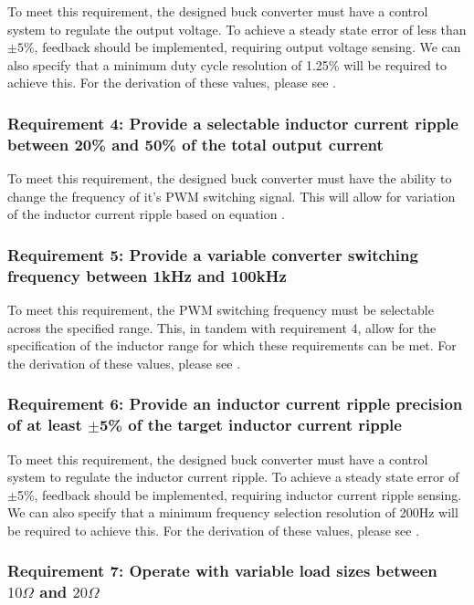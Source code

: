 To meet this requirement, the designed buck converter must have a control system to regulate the output voltage. To achieve a steady state error of less than $\pm5\%$, feedback should be implemented, requiring output voltage sensing. We can also specify that a minimum duty cycle resolution of 1.25\% will be required to achieve this. For the derivation of these values, please see .

\subsubsection*{Requirement 4: Provide a selectable inductor current ripple between 20\% and 50\% of the total output current}

To meet this requirement, the designed buck converter must have the ability to change the frequency of it's PWM switching signal. This will allow for variation of the inductor current ripple based on equation . 

\subsubsection*{Requirement 5: Provide a variable converter switching frequency between 1kHz and 100kHz}

To meet this requirement, the PWM switching frequency must be selectable across the specified range. This, in tandem with requirement 4, allow for the specification of the inductor range for which these requirements can be met. For the derivation of these values, please see .

\subsubsection*{Requirement 6: Provide  an  inductor  current  ripple  precision  of  at  least $\pm$5\%  of  the  target  inductor current ripple}

To meet this requirement, the designed buck converter must have a control system to regulate the inductor current ripple. To achieve a steady state error of $\pm$5\%, feedback should be implemented, requiring inductor current ripple sensing. We can also specify that a minimum frequency selection resolution of 200Hz will be required to achieve this. For the derivation of these values, please see .  


\subsubsection*{Requirement 7: Operate with variable load sizes between $10\Omega$ and $20\Omega$}

